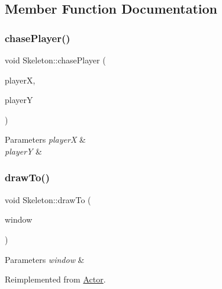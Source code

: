 \subsection{Member Function Documentation}
\mbox{\label{classSkeleton_aefa4683beb507bafaa2b20eaba4f478d}} 
\subsubsection{\texorpdfstring{chasePlayer()}{chasePlayer()}}
{\footnotesize\ttfamily void Skeleton\+::chase\+Player (\begin{DoxyParamCaption}\item[{float}]{playerX,  }\item[{float}]{playerY }\end{DoxyParamCaption})}


\begin{DoxyParams}{Parameters}
{\em playerX} & \\
\hline
{\em playerY} & \\
\hline
\end{DoxyParams}
\mbox{\label{classSkeleton_aa39ac09590a5274536dc2fc125cc62e6}} 
\subsubsection{\texorpdfstring{drawTo()}{drawTo()}}
{\footnotesize\ttfamily void Skeleton\+::draw\+To (\begin{DoxyParamCaption}\item[{sf\+::\+Render\+Window \&}]{window }\end{DoxyParamCaption})\hspace{0.3cm}{\ttfamily [virtual]}}


\begin{DoxyParams}{Parameters}
{\em window} & \\
\hline
\end{DoxyParams}


Reimplemented from \mbox{\hyperlink{classActor_af73a6f6670f0507c9e55ec2f61293535}{Actor}}.

\mbox{\label{classSkeleton_aee2055fa3d1db80392b365aa40c878bf}} 
